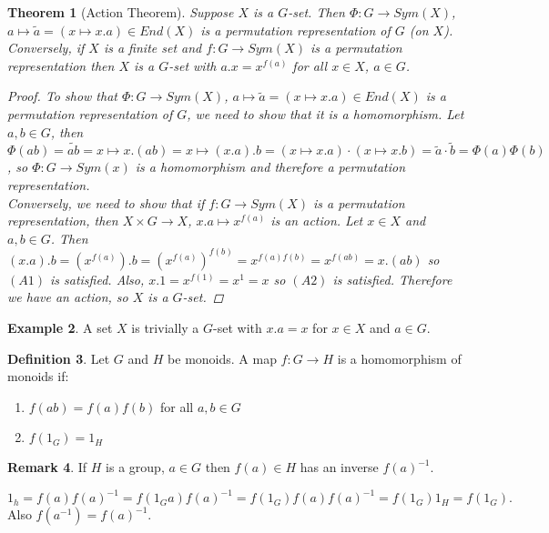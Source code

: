 \documentclass[12pt]{amsart}
\newtheorem{theorem}{Theorem}[section]
\theoremstyle{definition}
\newtheorem{example}[theorem]{Example}
\newtheorem{definition}[theorem]{Definition}
\newtheorem{remark}[theorem]{Remark}
\begin{document}
\begin{theorem}[Action Theorem]
Suppose $X$ is a $G$-set.  Then $\Phi:G\rightarrow Sym(X)$, $a\mapsto\tilde{a}=(x\mapsto x.a)\in End(X)$ is a permutation representation of $G$ (on $X$).  Conversely, if $X$ is a finite set and $f:G\rightarrow Sym(X)$ is a permutation representation then $X$ is a $G$-set with $a.x=x^{f(a)}$ for all $x\in X$, $a\in G$.

\begin{proof}
To show that $\Phi:G\rightarrow Sym(X)$, $a\mapsto\tilde{a}=(x\mapsto x.a)\in End(X)$ is a permutation representation of $G$, we need to show that it is a homomorphism.  Let $a, b\in G$, then $\Phi(ab)=\widetilde{ab}=x\mapsto x.(ab)=x\mapsto(x.a).b=(x\mapsto x.a)\cdot(x\mapsto x.b)=\tilde{a}\cdot\tilde{b}=\Phi(a)\Phi(b)$, so $\Phi:G\rightarrow Sym(x)$ is a homomorphism and therefore a permutation representation.\\
Conversely, we need to show that if $f:G\rightarrow Sym(X)$ is a permutation representation, then $X\times G\rightarrow X$, $x.a\mapsto x^{f(a)}$ is an action.  Let $x\in X$ and $a, b\in G$.  Then $(x.a).b=(x^{f(a)}).b=(x^{f(a)})^{f(b)}=x^{f(a)f(b)}=x^{f(ab)}=x.(ab)$ so $(A1)$ is satisfied.  Also, $x.1=x^{f(1)}=x^1=x$ so $(A2)$ is satisfied.  Therefore we have an action, so $X$ is a $G$-set.
\end{proof}
\end{theorem}

\begin{example}
A set $X$ is trivially a $G$-set with $x.a=x$ for $x\in X$ and $a\in G$.
\end{example}

\begin{definition}
Let $G$ and $H$ be monoids. A map $f: G \rightarrow H$ is a homomorphism of monoids if:
\begin{enumerate}
\item $f(ab) = f(a)f(b)$ for all $a, b \in G$
\item $f(1_{G}) = 1_{H}$
\end{enumerate}
\end{definition}

\begin{remark}
If $H$ is a group, $a \in G$ then $f(a) \in H$ has an inverse $f(a)^{-1}$.

$1_{h} = f(a)f(a)^{-1} = f( 1_{G} a )f(a)^{-1} = f(1_{G})f(a)f(a)^{-1} = f(1_{G}) 1_{H} = f(1_{G}).$
Also $f(a^{-1}) = f(a)^{-1}$.
\end{remark}
\end{document}

